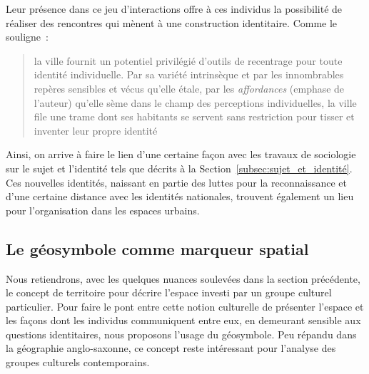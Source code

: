 Leur présence dans ce jeu d'interactions offre à ces individus la possibilité de réaliser des rencontres qui mènent à une construction identitaire. 
Comme le souligne~\citeauthor{DiMeo2007}: \blockquote[{\cite[81]{DiMeo2007}}][.]{\textelp{} la ville fournit un potentiel privilégié d’outils de recentrage pour toute identité individuelle. Par sa variété intrinsèque et par les innombrables repères sensibles et vécus qu’elle étale, par les \emph{affordances} (emphase de l'auteur) qu’elle sème dans le champ des perceptions individuelles, la ville file une trame dont ses habitants se servent sans restriction pour tisser et inventer leur propre identité}.

Ainsi, on arrive à faire le lien d'une certaine façon avec les travaux de sociologie sur le sujet et l'identité tels que décrits à la Section~\ref{subsec:sujet_et_identité}. 
Ces nouvelles identités, naissant en partie des luttes pour la reconnaissance et d'une certaine distance avec les identités nationales, trouvent également un lieu pour l'organisation dans les espaces urbains.





\subsection{Le géosymbole comme marqueur spatial}
\label{sec:le_symbole_comme_marqueur_spatial} Nous retiendrons, avec les quelques nuances soulevées dans la section précédente, le concept de territoire pour décrire l'espace investi par un groupe culturel particulier. 
Pour faire le pont entre cette notion culturelle de présenter l'espace et les façons dont les individus communiquent entre eux, en demeurant sensible aux questions identitaires, nous proposons l'usage du géosymbole. 
Peu répandu dans la géographie anglo-saxonne, ce concept reste intéressant pour l'analyse des groupes culturels contemporains.

